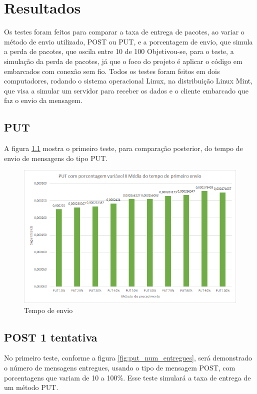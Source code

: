 \chapter{Resultados}

Os testes foram feitos para comparar a taxa de entrega de pacotes, ao variar o método de envio utilizado, POST ou PUT, e a porcentagem de envio, que simula a perda de pacotes, que oscila entre 10 de 100%
Objetivou-se, para o teste, a simulação da perda de pacotes, já que o foco do projeto é aplicar o código em embarcados com conexão sem fio.
Todos os testes foram feitos em dois computadores, rodando o sistema operacional Linux, na distribuição Linux Mint, que visa a simular um servidor para receber os dados e o cliente embarcado que faz o envio da mensagem.

\section{PUT}

A figura \ref{fig:put_tempo_envio} mostra o primeiro teste, para comparação posterior, do tempo de envio de mensagens do tipo PUT.

\begin{figure}[!htb]
	\centering
	\includegraphics[width=.8\textwidth]{../imagens/PUTxPrimeiroEnvio}
	\caption{Tempo de envio}
	\label{fig:put_tempo_envio}
\end{figure}

\section{POST 1 tentativa}
No primeiro teste, conforme a figura \ref{fig:put_num_entregues},
será demonstrado o número de mensagens entregues, usando o tipo de mensagem POST, com porcentagens que variam de 10 a 100\%.
Esse teste simulará a taxa de entrega de um método PUT.

